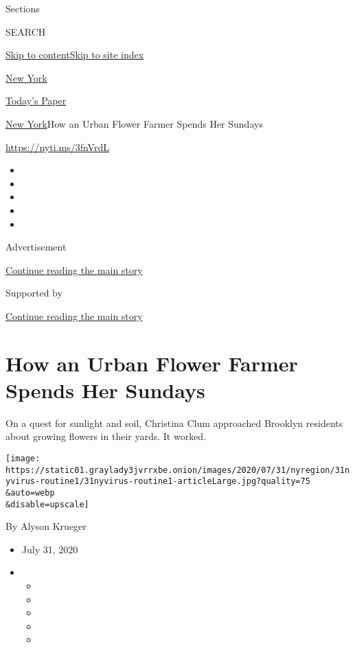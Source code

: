 Sections

SEARCH

\protect\hyperlink{site-content}{Skip to
content}\protect\hyperlink{site-index}{Skip to site index}

\href{https://www.nytimes3xbfgragh.onion/section/nyregion}{New York}

\href{https://myaccount.nytimes3xbfgragh.onion/auth/login?response_type=cookie\&client_id=vi}{}

\href{https://www.nytimes3xbfgragh.onion/section/todayspaper}{Today's
Paper}

\href{/section/nyregion}{New York}\textbar{}How an Urban Flower Farmer
Spends Her Sundays

\url{https://nyti.ms/3fnVrdL}

\begin{itemize}
\item
\item
\item
\item
\item
\end{itemize}

Advertisement

\protect\hyperlink{after-top}{Continue reading the main story}

Supported by

\protect\hyperlink{after-sponsor}{Continue reading the main story}

\hypertarget{how-an-urban-flower-farmer-spends-her-sundays}{%
\section{How an Urban Flower Farmer Spends Her
Sundays}\label{how-an-urban-flower-farmer-spends-her-sundays}}

On a quest for sunlight and soil, Christina Clum approached Brooklyn
residents about growing flowers in their yards. It worked.

\texttt{[image: https://static01.graylady3jvrrxbe.onion/images/2020/07/31/nyregion/31nyvirus-routine1/31nyvirus-routine1-articleLarge.jpg?quality=75\\\&auto=webp\\\&disable=upscale]}

By Alyson Krueger

\begin{itemize}
\item
  July 31, 2020
\item
  \begin{itemize}
  \item
  \item
  \item
  \item
  \item
  \end{itemize}
\end{itemize}

